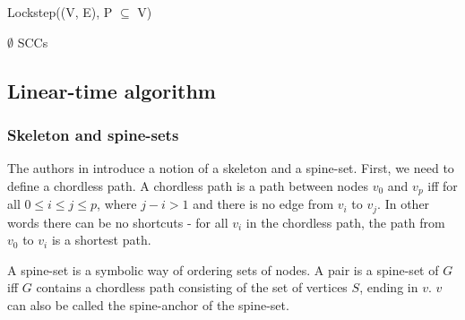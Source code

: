 \documentclass[../master/master.tex]{subfiles}
\begin{document}
\begin{algorithm}[H]
  \caption{Lockstep((V, E), P $\subseteq$ V)}
  \begin{algorithmic}[1]
    \Statex
     \State \Return $\emptyset$
    \EndIf
    \Statex
    \Statex
    \EndWhile
    \Statex
    \Else
    \EndIf
    \Statex
    \EndWhile
    \Statex
    \State \Return SCCs
  \end{algorithmic}
\end{algorithm}

\subsection{Linear-time algorithm}
\subsubsection{Skeleton and spine-sets}
The authors in \cite{linear} introduce a notion of a skeleton and a spine-set. First, we need to define a chordless path. A chordless path is a path between nodes $v_0$ and $v_p$ iff for all $0\leq i \leq j \leq p$, where $j-i>1$ and there is no edge from $v_i$ to $v_j$. In other words there can be no shortcuts - for all $v_i$ in the chordless path, the path from $v_0$ to $v_i$ is a shortest path.

A spine-set is a symbolic way of ordering sets of nodes. A pair  is a spine-set of $G$ iff $G$ contains a chordless path consisting of the set of vertices $S$, ending in $v$. $v$ can also be called the spine-anchor of the spine-set.
\end{document}
